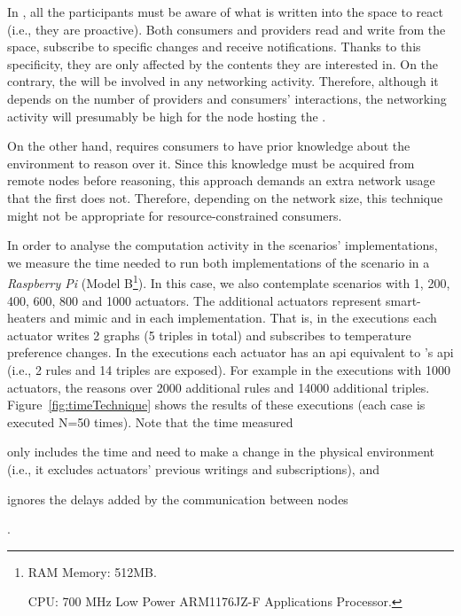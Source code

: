 In \spaceActuation{}, all the participants must be aware of what is written into the space to react (i.e., they are proactive).
Both consumers and providers read and write from the space, subscribe to specific changes and receive notifications.
Thanks to this specificity, they are only affected by the contents they are interested in. %
On the contrary, the \Space{} will be involved in any networking activity.
Therefore, although it depends on the number of providers and consumers' interactions, the networking activity will presumably be high for the node hosting the \Space{}.


On the other hand, \restActuation{} requires consumers to have prior knowledge about the environment to reason over it. %
Since this knowledge must be acquired from remote nodes before reasoning, this approach demands an extra network usage that the first does not.
Therefore, depending on the network size, this technique might not be appropriate for resource-constrained consumers.


\bigskip


In order to analyse the computation activity in the scenarios' implementations, we measure the time needed to run both implementations of the scenario in a \emph{Raspberry Pi} (Model B\footnote{
RAM Memory: 512MB.

CPU: 700 MHz Low Power ARM1176JZ-F Applications Processor.
}).
In this case, we also contemplate scenarios with 1, 200, 400, 600, 800 and 1000 actuators.
The additional actuators represent smart-heaters and mimic \nodeProvSpace{} and \nodeProvRest{} in each implementation.
That is, in the \spaceActuation{} executions each actuator writes 2 graphs (5 triples in total) and subscribes to temperature preference changes.
In the \restActuation{} executions each actuator has an \ac{api} equivalent to \nodeProvRest{}'s \ac{api} (i.e., 2 rules and 14 triples are exposed).
For example in the \nodeProvRest{} executions with 1000 actuators, the \nodeConsRest{} reasons over 2000 additional rules and 14000 additional triples.
Figure~\ref{fig:timeTechnique} shows the results of these executions (each case is executed N=50 times).
Note that the time measured 
\begin{enumerate*}[label=\itshape\bfseries(\arabic*\upshape)]
  \item only includes the time \nodeConsSpace{} and \nodeConsRest{} need to make a change in the physical environment (i.e., it excludes actuators' previous writings and subscriptions), and
  \item ignores the delays added by the communication between nodes %
\end{enumerate*}.


